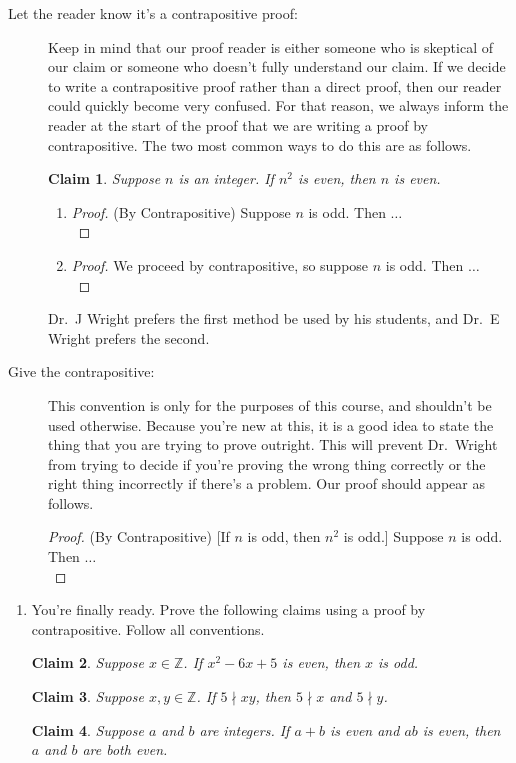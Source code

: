 \documentclass[12 pt]{article}
\newcommand{\Z}{\mathbb{Z}}
\newcommand{\ndivides}{\! \nmid \!}
\theoremstyle{definition}
\theoremstyle{plain}
\theoremstyle{mytheorem}
\theoremstyle{myexample}
\newtheorem{claim}{Claim}
\theoremstyle{mydefinition}
\begin{document}
\begin{description}
\item[Let the reader know it's a contrapositive proof:]  Keep in mind that our proof reader is either someone who is skeptical of our claim or someone who doesn't fully understand our claim.  If we decide to write a contrapositive proof rather than a direct proof, then our reader could quickly become very confused.  For that reason, we always inform the reader at the start of the proof that we are writing a proof by contrapositive.  The two most common ways to do this are as follows.
	\begin{claim}  Suppose $n$ is an integer.  If $n^2$ is even, then $n$ is even.
	\end{claim}
		\begin{enumerate}[label=(\roman*)]
		\item \begin{proof} (By Contrapositive) Suppose $n$ is odd.  Then $\ldots$\\
		\end{proof}
		\item \begin{proof} We proceed by contrapositive, so suppose $n$ is odd.  Then $\ldots$\\
		\end{proof}
		\end{enumerate}
	Dr.~J Wright prefers the first method be used by his students, and Dr.~E Wright prefers the second.
	
\item[Give the contrapositive:]  This convention is only for the purposes of this course, and shouldn't be used otherwise.  Because you're new at this, it is a good idea to state the thing that you are trying to prove outright.  This will prevent Dr.~Wright from trying to decide if you're proving the wrong thing correctly or the right thing incorrectly if there's a problem.  Our proof should appear as follows.
	\begin{proof}(By Contrapositive) [If $n$ is odd, then $n^2$ is odd.] Suppose $n$ is odd.  Then $\ldots$\\
	\end{proof}
\end{description}
\newpage
\begin{enumerate}[resume]
\item You're finally ready.  Prove the following claims using a proof by contrapositive.  Follow all conventions.

\begin{claim}  Suppose $x \in \Z$.  If $x^2-6x+5$ is even, then $x$ is odd.
\end{claim}
\vspace{3in}
\begin{claim}  Suppose $x,y \in \Z$.  If $5 \ndivides xy$, then $5 \ndivides x$ and $5 \ndivides y$.
\end{claim}
\newpage
\begin{claim}  Suppose $a$ and $b$ are integers.  If $a+b$ is even and $ab$ is even, then $a$ and $b$ are both even.
\end{claim}
\vspace{5in}
\end{enumerate}
\end{document}
